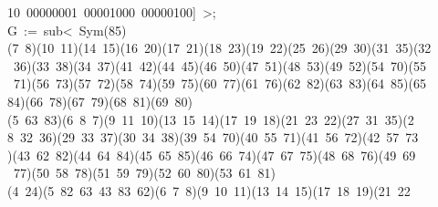 \begin{tabbing}
10\ 00000001\ 00001000\ 00000100]\ {\textgreater};\\[0pt]
G\ :=\ sub{\textless}\ Sym(85)\ {\textbar}\\[0pt]
(7\ 8)(10\ 11)(14\ 15)(16\ 20)(17\ 21)(18\ 23)(19\ 22)(25\ 26)(29\ 30)(31\ 35)(32\\[0pt]
\ 36)(33\ 38)(34\ 37)(41\ 42)(44\ 45)(46\ 50)(47\ 51)(48\ 53)(49\ 52)(54\ 70)(55\\[0pt]
\ 71)(56\ 73)(57\ 72)(58\ 74)(59\ 75)(60\ 77)(61\ 76)(62\ 82)(63\ 83)(64\ 85)(65\ \\[0pt]
84)(66\ 78)(67\ 79)(68\ 81)(69\ 80)\ \\[0pt]
(5\ 63\ 83)(6\ 8\ 7)(9\ 11\ 10)(13\ 15\ 14)(17\ 19\ 18)(21\ 23\ 22)(27\ 31\ 35)(2\\[0pt]
8\ 32\ 36)(29\ 33\ 37)(30\ 34\ 38)(39\ 54\ 70)(40\ 55\ 71)(41\ 56\ 72)(42\ 57\ 73\\[0pt]
)(43\ 62\ 82)(44\ 64\ 84)(45\ 65\ 85)(46\ 66\ 74)(47\ 67\ 75)(48\ 68\ 76)(49\ 69\\[0pt]
\ 77)(50\ 58\ 78)(51\ 59\ 79)(52\ 60\ 80)(53\ 61\ 81)\ \\[0pt]
(4\ 24)(5\ 82\ 63\ 43\ 83\ 62)(6\ 7\ 8)(9\ 10\ 11)(13\ 14\ 15)(17\ 18\ 19)(21\ 22\\[0pt]

\end{tabbing}
